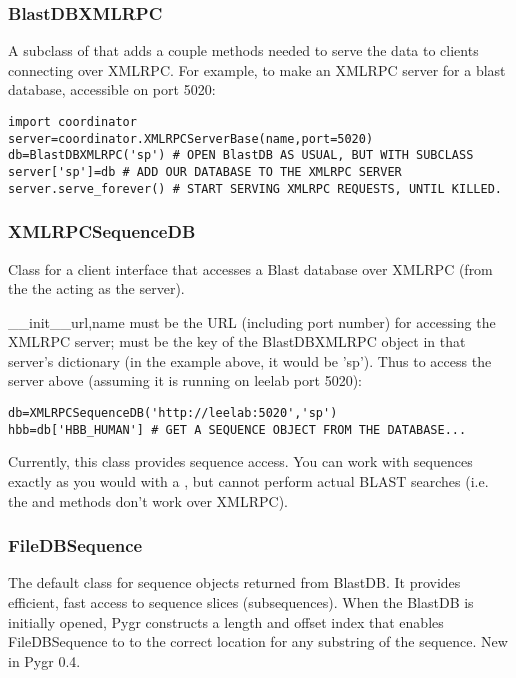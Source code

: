 \documentclass{howto}
\begin{document}
\subsubsection{BlastDBXMLRPC}
A subclass of  that adds a couple methods needed to serve
the data to clients connecting over XMLRPC.  For example, to make an XMLRPC
server for a blast database, accessible on port 5020:
\begin{verbatim}
import coordinator
server=coordinator.XMLRPCServerBase(name,port=5020)
db=BlastDBXMLRPC('sp') # OPEN BlastDB AS USUAL, BUT WITH SUBCLASS
server['sp']=db # ADD OUR DATABASE TO THE XMLRPC SERVER
server.serve_forever() # START SERVING XMLRPC REQUESTS, UNTIL KILLED.
\end{verbatim}

\subsubsection{XMLRPCSequenceDB}
Class for a client interface that accesses a Blast database over
XMLRPC (from the the  acting as the server).
\begin{funcdesc}{__init__}{url,name}
   must be the URL (including port number) for accessing the 
  XMLRPC server;  must be the key of the BlastDBXMLRPC object
  in that server's dictionary (in the example above, it would be 'sp').
  Thus to access the server above (assuming it is running on leelab port 5020):
\begin{verbatim}
db=XMLRPCSequenceDB('http://leelab:5020','sp')
hbb=db['HBB_HUMAN'] # GET A SEQUENCE OBJECT FROM THE DATABASE...
\end{verbatim}
\end{funcdesc}
Currently, this class provides sequence access.  You can work with sequences
exactly as you would with a , but cannot perform actual BLAST searches
(i.e. the  and  methods don't work over XMLRPC).

\subsubsection{FileDBSequence}
The default class for sequence objects returned from BlastDB.  It provides efficient,
fast access to sequence slices (subsequences).  When the BlastDB is initially opened,
Pygr constructs a length and offset index that enables FileDBSequence to 
to the correct location for any substring of the sequence.  New in Pygr 0.4.
\end{document}
